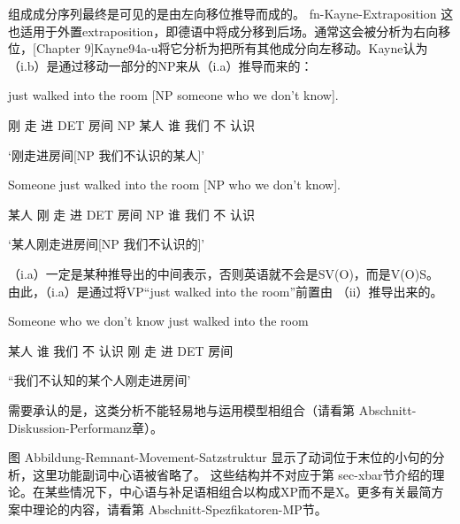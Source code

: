 组成成分序列最终是可见的是由左向移位推导而成的。 fn-Kayne-Extraposition
这也适用于外置extraposition，即德语中将成分移到后场。通常这会被分析为右向移位，[Chapter 9]Kayne94a-u将它分析为把所有其他成分向左移动。Kayne认为（i.b）是通过移动一部分的NP来从（i.a）推导而来的：

just walked into the room [NP someone who we don't know].

刚 走 进 DET  房间 NP 某人 谁 我们 不 认识

`刚走进房间[NP 我们不认识的某人]'

Someone just walked into the room [NP  who we don't know].

某人 刚 走 进 DET 房间 NP  谁 我们 不 认识

`某人刚走进房间[NP  我们不认识的]'

（i.a）一定是某种推导出的中间表示，否则英语就不会是SV(O)，而是V(O)S。
由此，（i.a）是通过将VP“just walked into the room”前置由 （ii）推导出来的。

Someone who we don't know just walked into the room

某人 谁 我们 不 认识 刚 走 进 DET 房间

“我们不认知的某个人刚走进房间'

需要承认的是，这类分析不能轻易地与运用模型相组合（请看第 Abschnitt-Diskussion-Performanz章）。


















图 Abbildung-Remnant-Movement-Satzstruktur 显示了动词位于末位的小句的分析，这里功能副词中心语被省略了。 
这些结构并不对应于第 sec-xbar节介绍的理论。在某些情况下，中心语与补足语相组合以构成XP而不是X。更多有关最简方案中理论的内容，请看第 Abschnitt-Spezfikatoren-MP节。




























































